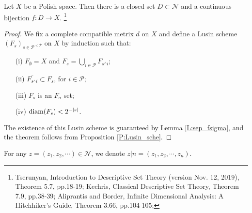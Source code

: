 \begin{theorem} \label{T:pol_bij}
Let $X$ be a Polish space. Then there is a closed set $D\subset \mathcal{N}$ and a
continuous bijection $f: D\to X$.
\footnote{
  Tserunyan, Introduction to Descriptive Set Theory (version Nov. 12, 2019), 
  Theorem 5.7, pp.18-19;
  Kechris, Classical Descriptive Set Theory, Theorem 7.9, pp.38-39;
  Aliprantis and Border, Infinite Dimensional Analysis: A 
  Hitchhiker's Guide, Theorem 3.66, pp.104-105;
}
\end{theorem}
\begin{proof}
We fix a complete compatible metrix $d$ on $X$ and define a Lusin scheme 
$(F_s)_{s\in \mathcal{P}^{<\mathcal{P}}}$ on $X$ by induction such that:
\begin{enumerate}
   \item[(i)] $F_{\emptyset}=X$ and 
              $F_s=\bigcup_{i\in\mathcal{P}} F_{s^\wedge i}$;
   \item[(ii)] $\overline{F_{s^\wedge i}}\subset F_s$, for $i\in\mathcal{P}$;
   \item[(iii)] $F_s$ is an $F_{\sigma}$ set;
   \item[(iv)] $\operatorname*{diam}(F_s)<2^{-|s|}$.
\end{enumerate}
The existence of this Lusin scheme is guaranteed by Lemma \ref{L:sep_fsigma},
and the theorem follows from Proposition \ref{P:Lusin_sche}.
\end{proof}


For any $z=(z_1,z_2,\cdots)\in \mathcal{N}$, we denote 
$z|n=(z_1,z_2,\cdots,z_n)$. 

